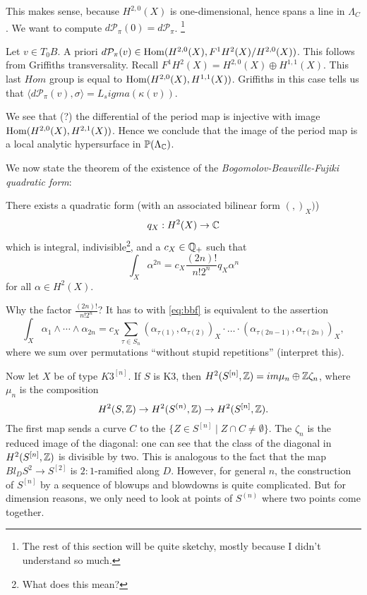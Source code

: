 \documentclass[11pt, english]{article}
\begin{document}
This makes sense, because $H^{2,0}(X)$ is one-dimensional, hence spans a line in $\Lambda_C$. We want to compute $d \mathcal P_\pi(0) = d \mathcal P_\pi$. \footnote{The rest of this section will be quite sketchy, mostly because I didn't understand so much.}

Let $v \in T_0B$. A priori $d\mathcal P_\pi(v) \in \operatorname{Hom}(H^{2,0}(X), F^1 H^2(X)/H^{2,0}(X))$. This follows from Griffiths transversality. Recall $F^1 H^2(X)= H^{2,0}(X) \oplus H^{1,1}(X)$. This last $Hom$ group is equal to $\operatorname{Hom}(H^{2,0}(X), H^{1,1}(X))$. Griffiths in this case tells us that $\langle d \mathcal P_\pi(v), \sigma \rangle = L_sigma(\kappa(v))$. 

We see that (?) the differential of the period map is injective with image $\operatorname{Hom}(H^{2,0}(X), H^{2,1}(X))$. Hence we conclude that the image of the period map is a local analytic hypersurface in $\mathbb{P}(\Lambda_{\mathbb{C}})$. 

We now state the theorem of the existence of the \emph{Bogomolov-Beauville-Fujiki quadratic form}:

\begin{thm}
There exists a quadratic form (with an associated bilinear form $(,)_X)$)
$$
q_X : H^2(X) \to \mathbb{C}
$$
which is integral, indivisible\footnote{What does this mean?}, and a $c_X \in \mathbb{Q}_+$ such that
\begin{equation}
\label{eq:bbf}
\int_X \alpha^{2n} = c_X \frac{(2n)!}{n! 2^n} q_X \alpha^n 
\end{equation}
for all $\alpha \in H^2(X)$.
\end{thm}

Why the factor $\frac{(2n)!}{n! 2^n}$? It has to with \eqref{eq:bbf} is equivalent to the assertion
$$
\int_X \alpha_1 \wedge \cdots \wedge \alpha_{2n} = c_X \sum_{\tau \in S_n} (\alpha_{\tau(1)}, \alpha_{\tau(2)})_X \cdot \ldots \cdot (\alpha_{\tau(2n-1)}, \alpha_{\tau(2n)})_X,
$$
where we sum over permutations ``without stupid repetitions'' (interpret this). 

Now let $X$ be of type $K3^{[n]}$. If $S$ is K3, then $H^2(S^{[n]},\mathbb{Z}) = im \mu_n \oplus \mathbb{Z} \zeta_n$, where $\mu_n$ is the composition
$$
H^2(S,\mathbb{Z}) \to H^2(S^{(n)},\mathbb{Z}) \to H^2(S^{[n]},\mathbb{Z}).
$$
The first map sends a curve $C$ to the $\{ Z \in S^{[n]} \mid Z \cap C \neq \emptyset \}$. The $\zeta_n$ is the reduced image of the diagonal: one can see that the class of the diagonal in $H^2(S^{[n]},\mathbb{Z})$ is divisible by two. This is analogous to the fact that the map $Bl_D S^2 \to S^{[2]}$ is $2:1$-ramified along $D$. However, for general $n$, the construction of $S^{[n]}$ by a sequence of blowups and blowdowns is quite complicated. But for dimension reasons, we only need to look at points of $S^{(n)}$ where two points come together.
\end{document}
